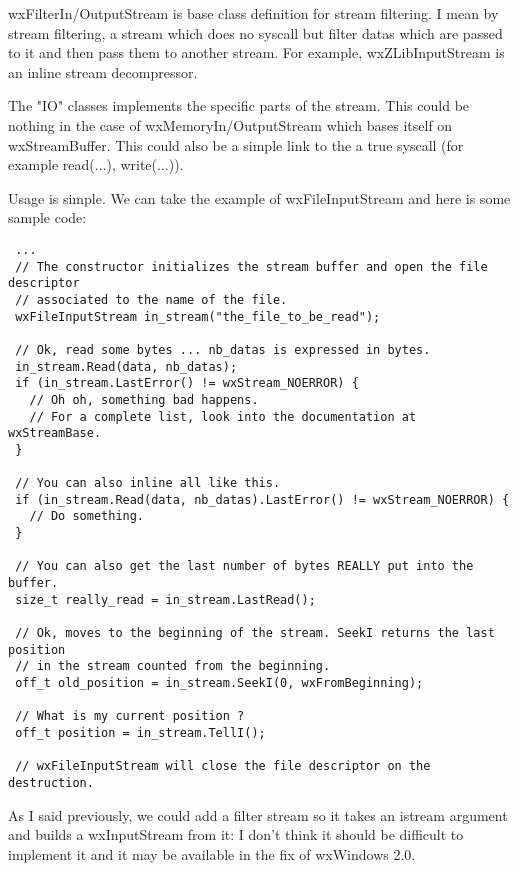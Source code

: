 wxFilterIn/OutputStream is base class definition for stream filtering.
I mean by stream filtering, a stream which does no syscall but filter datas
which are passed to it and then pass them to another stream.
For example, wxZLibInputStream is an inline stream decompressor.

The "IO" classes implements the specific parts of the stream. This could be
nothing in the case of wxMemoryIn/OutputStream which bases itself on
wxStreamBuffer. This could also be a simple link to the a true syscall
(for example read(...), write(...)).


Usage is simple. We can take the example of wxFileInputStream and here is some sample
code:

\begin{verbatim}
 ...
 // The constructor initializes the stream buffer and open the file descriptor
 // associated to the name of the file.
 wxFileInputStream in_stream("the_file_to_be_read");

 // Ok, read some bytes ... nb_datas is expressed in bytes.
 in_stream.Read(data, nb_datas);
 if (in_stream.LastError() != wxStream_NOERROR) {
   // Oh oh, something bad happens.
   // For a complete list, look into the documentation at wxStreamBase.
 }

 // You can also inline all like this.
 if (in_stream.Read(data, nb_datas).LastError() != wxStream_NOERROR) {
   // Do something.
 }

 // You can also get the last number of bytes REALLY put into the buffer.
 size_t really_read = in_stream.LastRead();

 // Ok, moves to the beginning of the stream. SeekI returns the last position 
 // in the stream counted from the beginning.
 off_t old_position = in_stream.SeekI(0, wxFromBeginning);
 
 // What is my current position ?
 off_t position = in_stream.TellI();

 // wxFileInputStream will close the file descriptor on the destruction.
\end{verbatim}


As I said previously, we could add a filter stream so it takes an istream
argument and builds a wxInputStream from it: I don't think it should 
be difficult to implement it and it may be available in the fix of wxWindows 2.0.

